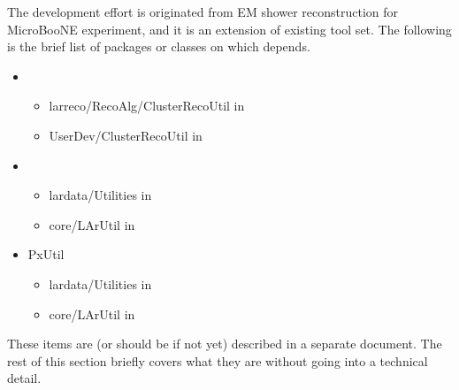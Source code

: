 
The {\cmtool} development effort is originated from EM shower reconstruction for MicroBooNE experiment, and it is an extension of existing tool set. The following is the brief list of packages or {\CPP} classes on which {\cmtool} depends.
\begin{itemize}
\item[] {\cru}
    \begin{itemize}
    \item larreco/RecoAlg/ClusterRecoUtil in {\larsoft}
    \item UserDev/ClusterRecoUtil in {\larlight}
    \end{itemize}
\item[] {\geoutil}
    \begin{itemize}
    \item lardata/Utilities in {\larsoft}
    \item core/LArUtil in {\larlight}
    \end{itemize}
\item[] {\ttfamily PxUtil}
    \begin{itemize}
    \item lardata/Utilities in {\larsoft}
    \item core/LArUtil in {\larlight}
    \end{itemize}
\end{itemize}
These items are (or should be if not yet) described in a separate document.
The rest of this section briefly covers what they are without going into a technical detail.

